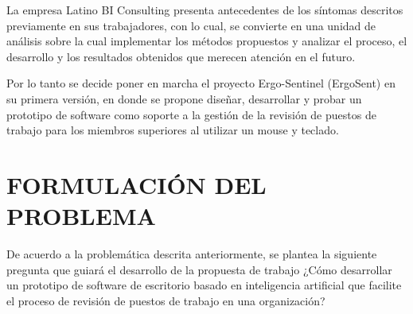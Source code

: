 La empresa Latino BI Consulting presenta antecedentes de los síntomas descritos previamente en sus trabajadores, con lo cual, se convierte en una unidad de análisis sobre la cual implementar los métodos propuestos y analizar el proceso, el desarrollo y los resultados obtenidos que merecen atención en el futuro.

Por lo tanto se decide poner en marcha el proyecto Ergo-Sentinel (ErgoSent) en su primera versión, en donde se propone diseñar, desarrollar y probar un prototipo de software como soporte a la gestión de la revisión de puestos de trabajo para los miembros superiores al utilizar un mouse y teclado.

\section{FORMULACIÓN DEL PROBLEMA}
De acuerdo a la problemática descrita anteriormente, se plantea la siguiente pregunta que guiará el desarrollo de la propuesta de trabajo ¿Cómo desarrollar un prototipo de software de escritorio basado en inteligencia artificial que facilite el proceso de revisión de puestos de trabajo en una organización?